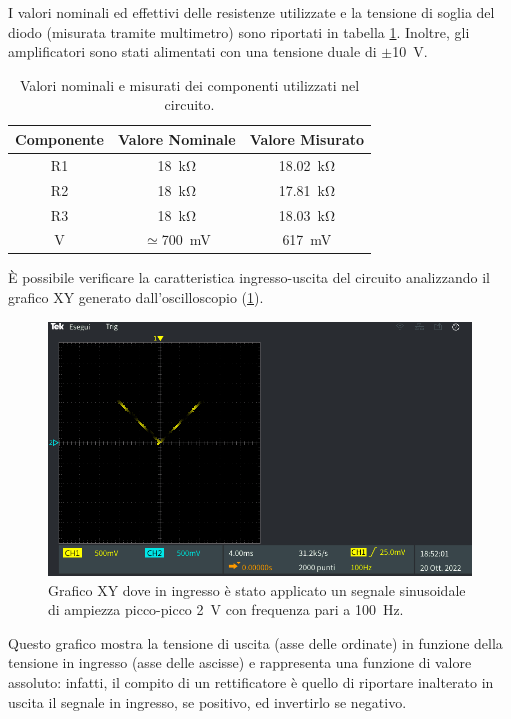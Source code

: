 \noindent
I valori nominali ed effettivi delle resistenze utilizzate e la tensione di soglia del diodo (misurata tramite multimetro) sono riportati in tabella \ref{tab:valori_componenti_1}. Inoltre, gli amplificatori sono stati alimentati con una tensione duale di $\pm$\SI{10}{\volt}.

\def\arraystretch{1.3}
\begin{table}[h]
	\centering
	\begin{tabular}{|c|c|c|}
		\hline
		Componente	& Valore Nominale & Valore Misurato \\ \hline
		R1 &\SI{18}{\kilo\ohm} & \SI{18,02}{\kilo\ohm} \\ \hline
		R2 &\SI{18}{\kilo\ohm} & \SI{17,81}{\kilo\ohm} \\ \hline
		R3 &\SI{18}{\kilo\ohm} & \SI{18,03}{\kilo\ohm} \\ \hline
		V\sub{D} & $\simeq$\SI{700}{\milli\volt} & \SI{617}{\milli\volt} \\ \hline
	\end{tabular}
	\caption{Valori nominali e misurati dei componenti utilizzati nel circuito.}
	\label{tab:valori_componenti_1}
\end{table}

\noindent
\`E possibile verificare la caratteristica ingresso-uscita del circuito analizzando il grafico XY generato dall'oscilloscopio (\Fig\ref{fig:xy_circuito_1}). 
\begin{figure}[tbh]
	\centering
	\includegraphics[width=\linewidth]{./ImageFiles/Laboratorio 3/TEK00000.PNG}
	\caption{Grafico XY dove in ingresso è stato applicato un segnale sinusoidale di ampiezza picco-picco \SI{2}{\volt} con frequenza pari a \SI{100}{\hertz}.}
	\label{fig:xy_circuito_1}
\end{figure}
Questo grafico mostra la tensione di uscita (asse delle ordinate) in funzione della tensione in ingresso (asse delle ascisse) e rappresenta una funzione di valore assoluto: infatti, il compito di un rettificatore è quello di riportare inalterato in uscita il segnale in ingresso, se positivo, ed invertirlo se negativo.


